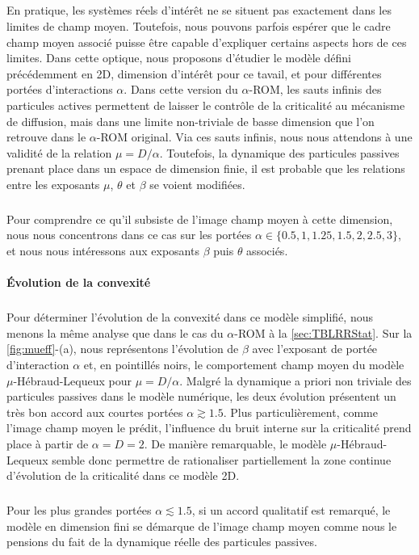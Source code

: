 \subparagraph{}En pratique, les systèmes réels d'intérêt ne se situent pas exactement dans les limites de champ moyen. Toutefois, nous pouvons parfois espérer que le cadre champ moyen associé puisse être capable d'expliquer certains aspects hors de ces limites. Dans cette optique, nous proposons d'étudier le modèle défini précédemment en 2D, dimension d'intérêt pour ce tavail, et pour différentes portées d'interactions $\alpha$. Dans cette version du $\alpha$-ROM, les sauts infinis des particules actives permettent de laisser le contrôle de la criticalité au mécanisme de diffusion, mais dans une limite non-triviale de basse dimension que l'on retrouve dans le $\alpha$-ROM original. Via ces sauts infinis, nous nous attendons à une validité de la relation $\mu = D/\alpha$. Toutefois, la dynamique des particules passives prenant place dans un espace de dimension finie, il est probable que les relations entre les exposants $\mu$, $\theta$ et $\beta$ se voient modifiées. 

\subparagraph{}Pour comprendre ce qu'il subsiste de l'image champ moyen à cette dimension, nous nous concentrons dans ce cas sur les portées $\alpha \in \{ 0.5, 1, 1.25, 1.5, 2, 2.5, 3 \}$, et nous nous intéressons aux exposants $\beta$ puis $\theta$ associés.

\paragraph{Évolution de la convexité}

\label{sec:sautsinfinis}

\subparagraph{}Pour déterminer l'évolution de la convexité dans ce modèle simplifié, nous menons la même analyse que dans le cas du $\alpha$-ROM à la \autoref{sec:TBLRRStat}. Sur la \autoref{fig:mueff}-(a), nous représentons l'évolution de $\beta$ avec l'exposant de portée d'interaction $\alpha$ et, en pointillés noirs, le comportement champ moyen du modèle $\mu$-Hébraud-Lequeux pour $\mu = D/\alpha$. Malgré la dynamique a priori non triviale des particules passives dans le modèle numérique, les deux évolution présentent un très bon accord aux courtes portées $\alpha \gtrsim 1.5$. Plus particulièrement, comme l'image champ moyen le prédit, l'influence du bruit interne sur la criticalité prend place à partir de $\alpha = D = 2$. De manière remarquable, le modèle $\mu$-Hébraud-Lequeux semble donc permettre de rationaliser partiellement la zone continue d'évolution de la criticalité dans ce modèle 2D.

\subparagraph{}Pour les plus grandes portées $\alpha\lesssim 1.5$, si un accord qualitatif est remarqué, le modèle en dimension fini se démarque de l'image champ moyen comme nous le pensions du fait de la dynamique réelle des particules passives.

